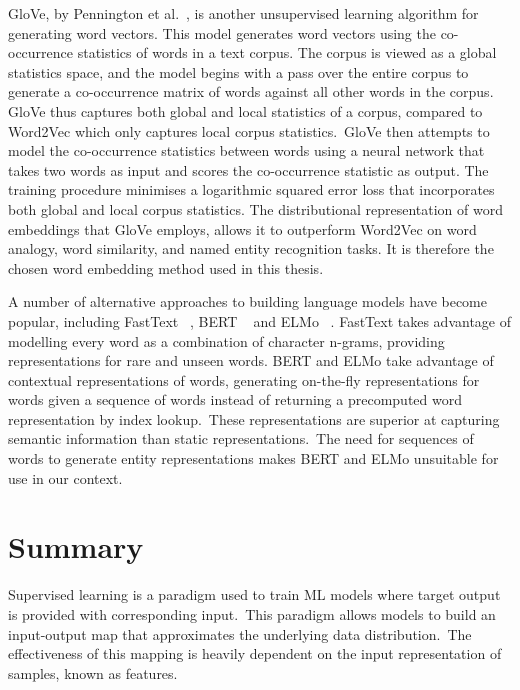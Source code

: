 \noindent GloVe, by Pennington et al.\unskip ~\citep{pennington2014glove}, is another unsupervised learning algorithm for generating word vectors. This model generates word vectors using the co-occurrence statistics of words in a text corpus. The corpus is viewed as a global statistics space, and the model begins with a pass over the entire corpus to generate a co-occurrence matrix of words against all other words in the corpus. GloVe thus captures both global and local statistics of a corpus, compared to Word2Vec which only captures local corpus statistics.\ GloVe then attempts to model the co-occurrence statistics between words using a neural network that takes two words as input and scores the co-occurrence statistic as output. The training procedure minimises a logarithmic squared error loss that incorporates both global and local corpus statistics. The distributional representation of word embeddings that GloVe employs, allows it to outperform Word2Vec on word analogy, word similarity, and named entity recognition tasks. It is therefore the chosen word embedding method used in this thesis. \par

\noindent A number of alternative approaches to building language models have become popular, including FastText \unskip ~\citep{bojanowski2017enriching}, BERT \unskip ~\citep{vaswani2017attention} and ELMo \unskip ~\citep{peters2018deep}. FastText takes advantage of modelling every word as a combination of character n-grams, providing representations for rare and unseen words. BERT and ELMo take advantage of contextual representations of words, generating on-the-fly representations for words given a sequence of words instead of returning a precomputed word representation by index lookup.\ These representations are superior at capturing semantic information than static representations.\ The need for sequences of words to generate entity representations makes BERT and ELMo unsuitable for use in our context.



\section{Summary}

Supervised learning is a paradigm used to train ML models where target output is provided with corresponding input.\ This paradigm allows models to build an input-output map that approximates the underlying data distribution.\ The effectiveness of this mapping is heavily dependent on the input representation of samples, known as features. \par

